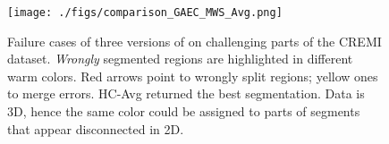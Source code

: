 





\begin{figure}
\centering
\texttt{[image: ./figs/comparison\_GAEC\_MWS\_Avg.png]} %
\caption{Failure cases of three versions of \algname{} on challenging parts of the CREMI dataset. \emph{Wrongly} segmented regions are highlighted in different warm colors. Red arrows point to wrongly split regions; yellow ones to merge errors. HC-Avg returned the best segmentation. Data is 3D, hence the same color could be assigned to parts of segments that appear disconnected in 2D.  
\label{fig:failure_cases}}
\end{figure}








